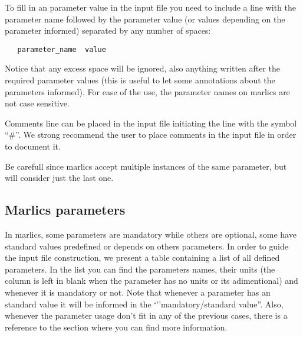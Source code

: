 \documentclass{article}
\begin{document}
To fill in an parameter value in the input file you need to include a
line with the parameter name followed by the parameter value (or values depending on the parameter informed) separated by any number of spaces:
\begin{lstlisting}
   parameter_name  value
\end{lstlisting}
Notice that any excess space will be ignored, also anything written
after the required parameter values (this is useful to let some
annotations about the parameters informed). For ease of the use, the
parameter names on marlics are not case sensitive.

Comments line can be placed in the input file initiating the line with
the symbol ``\#''. We strong recommend the user to place comments in
the input file in order to document it.

Be carefull since marlics accept multiple instances of the same
parameter, but will consider just the last one.


\subsection{Marlics parameters} \label{sec:parameterlist}

In marlics, some parameters are mandatory while others are optional,
some have standard values predefined or depends on others
parameters. In order to guide the input file construction, we present
a table containing a list of all defined parameters. In the list you
can find the parameters names, their units (the column is left in
blank when the parameter has no units or its adimentional) and
whenever it is mandatory or not. Note that whenever a parameter has an
standard value it will be informed in the `''mandatory/standard
value''. Also, whenever the parameter usage don't fit in any of the
previous cases, there is a reference to the section where you can find
more information.
\end{document}
